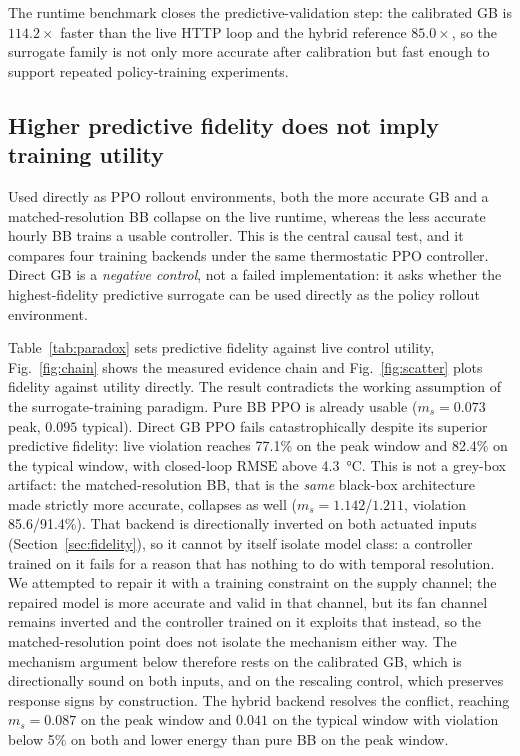\documentclass[5p]{elsarticle}
\newcommand{\RMSE}{\ensuremath{\mathrm{RMSE}}}
\newcommand{\ms}{\ensuremath{m_s}}
\begin{document}
The runtime benchmark closes the predictive-validation step: the calibrated GB is $114.2\times$
faster than the live HTTP loop and the hybrid reference $85.0\times$, so the surrogate family is not
only more accurate after calibration but fast enough to support repeated policy-training
experiments.

\subsection{Higher predictive fidelity does not imply training utility}\label{sec:paradox}

Used directly as PPO rollout environments, both the more accurate GB and a matched-resolution BB
collapse on the live runtime, whereas the less accurate hourly BB trains a usable controller. This
is the central causal test, and it compares four training backends under the same thermostatic PPO
controller. Direct GB is a \emph{negative control}, not a failed implementation: it asks whether the
highest-fidelity predictive surrogate can be used directly as the policy rollout environment.

Table~\ref{tab:paradox} sets predictive fidelity against live control utility, Fig.~\ref{fig:chain}
shows the measured evidence chain and Fig.~\ref{fig:scatter} plots fidelity against utility
directly. The result contradicts the working assumption of the surrogate-training paradigm. Pure BB
PPO is already usable ($\ms=0.073$ peak, $0.095$ typical). Direct GB PPO fails catastrophically
despite its superior predictive fidelity: live violation reaches 77.1\% on the peak window and
82.4\% on the typical window, with closed-loop \RMSE{} above \SI{4.3}{\celsius}. This is not a
grey-box artifact: the matched-resolution BB, that is the \emph{same} black-box architecture made
strictly more accurate, collapses as well ($\ms=1.142$/$1.211$, violation 85.6/91.4\%). That backend
is directionally inverted on both actuated inputs (Section~\ref{sec:fidelity}), so it cannot by
itself isolate model class: a controller trained on it fails for a reason that has nothing to do
with temporal resolution. We attempted to repair it with a training constraint on the supply
channel; the repaired model is more accurate and valid in that channel, but its fan channel remains
inverted and the controller trained on it exploits that instead, so the matched-resolution point
does not isolate the mechanism either way. The mechanism argument below therefore rests on the
calibrated GB, which is directionally sound on both inputs, and on the rescaling control, which
preserves response signs by construction. The hybrid
backend resolves the conflict, reaching $\ms=0.087$ on the peak window and $0.041$ on the typical
window with violation below 5\% on both and lower energy than pure BB on the peak window.
\end{document}
